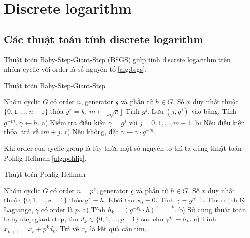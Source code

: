 \documentclass{mynotes}
\begin{document}
\chapter{Discrete logarithm}

\section{Các thuật toán tính discrete logarithm}

Thuật toán Baby-Step-Giant-Step (BSGS) giúp tính discrete logarithm trên nhóm cyclic với order là số nguyên tố \ref{alg:bsgs}.

\begin{algorithm}[H]
    \caption{Thuật toán Baby-Step-Giant-Step}
    \label{alg:bsgs}
    \begin{algorithmic}[1]
        \Require Nhóm cyclic $G$ có order $n$, generator $g$ và phần tử $h \in G$.
        \Ensure Số $x$ duy nhất thuộc $\{ 0, 1, \ldots, n-1 \}$ thỏa $g^x = h$.
        $m \gets \lfloor \sqrt{n} \rfloor$
            \State Tính $g^j$. Lưu $(j, g^j)$ vào bảng.
        \EndFor
        \State Tính $g^{-m}$.
        \State $\gamma \gets h$.
            \State a) Kiểm tra điều kiện $\gamma = g^j$ với $j = 0, 1, \ldots, m-1$.
            \State b) Nếu điều kiện thỏa, trả về $im + j$.
            \State c) Nếu không, đặt $\gamma \gets \gamma \cdot g^{-m}$.
        \EndFor
    \end{algorithmic}
\end{algorithm}

Khi order của cyclic group là lũy thừa một số nguyên tố thì ta dùng thuật toán Pohlig-Hellman \ref{alg:pohlig}.

\begin{algorithm}[H]
    \caption{Thuật toán Pohlig-Hellman}
    \label{alg:pohlig}
    \begin{algorithmic}[1]
        \Require Nhóm cyclic $G$ có order $n=p^e$, generator $g$ và phần tử $h \in G$.
        \Ensure Số $x$ duy nhất thuộc $\{ 0, 1, \ldots, n-1 \}$ thỏa $g^x = h$.
        \State Khởi tạo $x_0 = 0$.
        \State Tính $\gamma = g^{p^{e-1}}$. Theo định lý Lagrange, $\gamma$ có order là $p$.
            \State a) Tính $h_k = (g^{-x_k} \cdot h)^{e-1-k}$.
            \State b) Sử dụng thuật toán baby-step-giant-step, tìm $d_k \in \{ 0, 1, \ldots, p-1 \}$ sao cho $\gamma^{d_k} = h_k$. %
            \State c) Tính $x_{k+1} = x_k + p^k d_k$.
        \EndFor
        \State Trả về $x_e$ là kết quả cần tìm.
    \end{algorithmic}
\end{algorithm}
\end{document}

